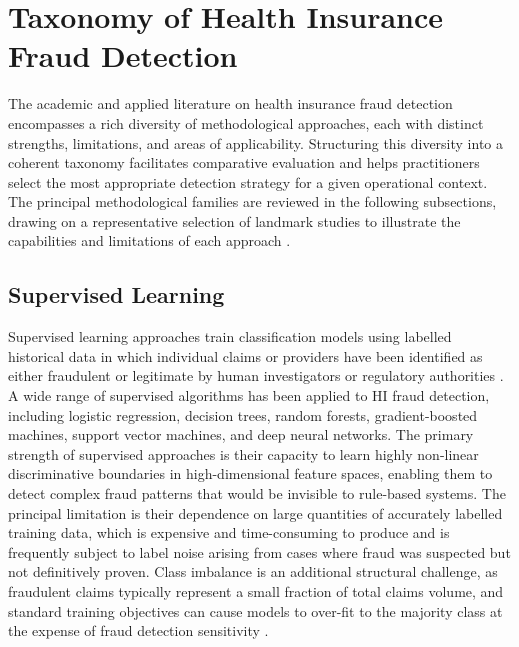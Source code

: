 \section{Taxonomy of Health Insurance Fraud Detection}

The academic and applied literature on health insurance fraud detection encompasses a rich diversity of methodological approaches, each with distinct strengths, limitations, and areas of applicability. Structuring this diversity into a coherent taxonomy facilitates comparative evaluation and helps practitioners select the most appropriate detection strategy for a given operational context. The principal methodological families are reviewed in the following subsections, drawing on a representative selection of landmark studies to illustrate the capabilities and limitations of each approach \cite{pareek2023,hilal2022}.

\subsection{Supervised Learning}

Supervised learning approaches train classification models using labelled historical data in which individual claims or providers have been identified as either fraudulent or legitimate by human investigators or regulatory authorities \cite{duman2017}. A wide range of supervised algorithms has been applied to HI fraud detection, including logistic regression, decision trees, random forests, gradient-boosted machines, support vector machines, and deep neural networks. The primary strength of supervised approaches is their capacity to learn highly non-linear discriminative boundaries in high-dimensional feature spaces, enabling them to detect complex fraud patterns that would be invisible to rule-based systems. The principal limitation is their dependence on large quantities of accurately labelled training data, which is expensive and time-consuming to produce and is frequently subject to label noise arising from cases where fraud was suspected but not definitively proven. Class imbalance is an additional structural challenge, as fraudulent claims typically represent a small fraction of total claims volume, and standard training objectives can cause models to over-fit to the majority class at the expense of fraud detection sensitivity \cite{kose2015}.

